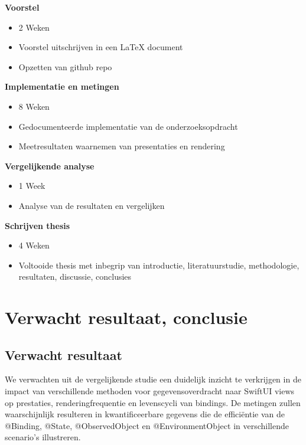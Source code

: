 \textbf{Voorstel}
\begin{itemize}
    \item {2 Weken}
    \item {Voorstel uitschrijven in een LaTeX document}
    \item {Opzetten van github repo}
\end{itemize}

\textbf{Implementatie en metingen}
\begin{itemize}
    \item {8 Weken}
    \item {Gedocumenteerde implementatie van de onderzoeksopdracht}
    \item {Meetresultaten waarnemen van presentaties en rendering}
\end{itemize}

\textbf{Vergelijkende analyse}
\begin{itemize}
    \item {1 Week}
    \item {Analyse van de resultaten en vergelijken}
\end{itemize}

\textbf{Schrijven thesis}
\begin{itemize}
    \item {4 Weken}
    \item {Voltooide thesis met inbegrip van introductie, literatuurstudie, methodologie, resultaten, discussie, conclusies}
\end{itemize}



\section{Verwacht resultaat, conclusie}
\label{sec:verwachte_resultaten}


\subsection{Verwacht resultaat}
We verwachten uit de vergelijkende studie een duidelijk inzicht te verkrijgen in de impact van verschillende methoden voor gegevensoverdracht naar SwiftUI views op prestaties, renderingfrequentie en levenscycli van bindings. De metingen zullen waarschijnlijk resulteren in kwantificeerbare gegevens die de efficiëntie van de @Binding, @State, @ObservedObject en @EnvironmentObject in verschillende scenario's illustreren.

